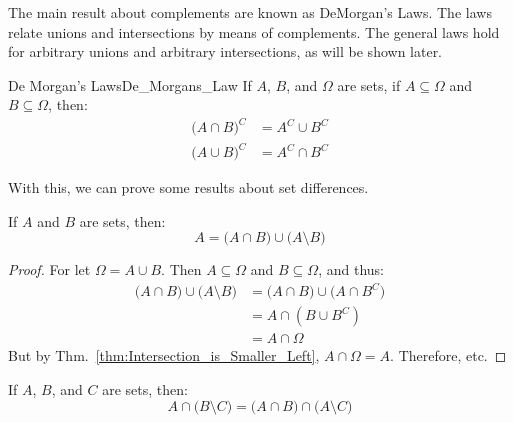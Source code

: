         The main result about complements are known as
        DeMorgan's Laws. The laws relate unions and
        intersections by means of complements. The general
        laws hold for arbitrary unions and arbitrary
        intersections, as will be shown later.
        \begin{ftheorem}{De Morgan's Laws}{De_Morgans_Law}
            If $A$, $B$, and $\Omega$ are sets, if
            $A\subseteq\Omega$ and $B\subseteq\Omega$, then:
            \begin{subequations}
                \begin{align}
                    \big(A\cap{B}\big)^{C}
                    &=A^{C}\cup{B}^{C}\\
                    \big(A\cup{B}\big)^{C}
                    &=A^{C}\cap{B}^{C}
                \end{align}
            \end{subequations}
        \end{ftheorem}
        With this, we can prove some results about
        set differences.
        \begin{theorem}
            If $A$ and $B$ are sets, then:
            \begin{equation}
                A=\big(A\cap{B}\big)
                    \cup\big(A\setminus{B}\big)
            \end{equation}
        \end{theorem}
        \begin{proof}
            For let $\Omega=A\cup{B}$. Then
            $A\subseteq\Omega$ and $B\subseteq\Omega$,
            and thus:
            \begin{subequations}
                \begin{align}
                    \big(A\cap{B})\cup\big(A\setminus{B}\big)
                    &=\big(A\cap{B}\big)
                        \cup\big(A\cap{B}^{C}\big)\\
                    &=A\cap(B\cup{B}^{C})\\
                    &=A\cap\Omega
                \end{align}
            \end{subequations}
            But by Thm.~\ref{thm:Intersection_is_Smaller_Left},
            $A\cap\Omega=A$. Therefore, etc.
        \end{proof}
        \begin{theorem}
            If $A$, $B$, and $C$ are sets, then:
            \begin{equation}
                A\cap\big(B\setminus{C}\big)
                =\big(A\cap{B}\big)\cap\big(A\setminus{C}\big)
            \end{equation}
        \end{theorem}

